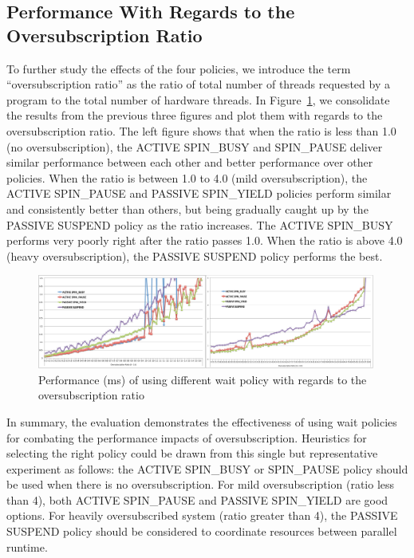 \subsection{Performance With Regards to the Oversubscription Ratio}
To further study the effects of the four policies, %
we introduce the term ``oversubscription ratio'' as the ratio of total number of
threads requested by a program to the total number of hardware threads. 
In Figure~\ref{fig:ovratio}, we consolidate the results from the previous three figures and plot them with regards to 
the oversubscription ratio. The left figure shows that when the ratio is less than 1.0 (no oversubscription), 
the {\sf ACTIVE} {\sf SPIN\_BUSY} and {\sf SPIN\_PAUSE} 
deliver similar performance between each other and better performance over other policies. 
When the ratio is between 1.0 to 4.0 (mild oversubscription), the {\sf ACTIVE SPIN\_PAUSE} and {\sf PASSIVE SPIN\_YIELD} policies 
perform similar and consistently better than others, but being gradually caught up by the {\sf PASSIVE SUSPEND} policy as the ratio increases. 
The {\sf ACTIVE SPIN\_BUSY} performs very poorly right after the ratio passes 1.0. 
When the ratio is above 4.0 (heavy oversubscription), the {\sf PASSIVE SUSPEND} policy performs the best. 
\begin{figure}[h]
    \includegraphics[width=0.99\textwidth] {images/ovratio}
    \caption{Performance (ms) of using different wait policy with regards to the oversubscription ratio}
    \label{fig:ovratio}
\end{figure}

In summary, the evaluation demonstrates the effectiveness of using wait policies for combating the performance 
impacts of oversubscription. Heuristics for selecting the right policy 
could be drawn from this single but representative experiment as follows:
the {\sf ACTIVE SPIN\_BUSY} or {SPIN\_PAUSE} policy should be used when there is no oversubscription. 
For mild oversubscription (ratio less than 4), both {\sf ACTIVE SPIN\_PAUSE} and {\sf PASSIVE SPIN\_YIELD} are good options. 
For heavily oversubscribed system (ratio greater than 4), the {\sf PASSIVE SUSPEND} policy should be 
considered to coordinate resources between parallel runtime. 

